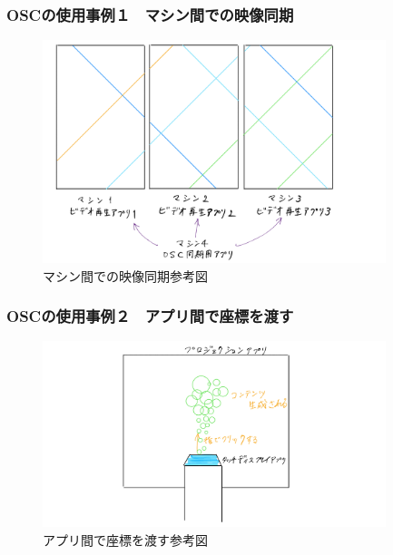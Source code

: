 \documentclass[10pt, dvipdfmx]{beamer}
\begin{document}
        \begin{frame}
            \frametitle{OSCの使用事例１　マシン間での映像同期}
                \begin{figure}[htb]
                    \includegraphics[width=100mm]{images/osc-1.png}
                    \caption{マシン間での映像同期参考図}
                    \label{fig:osc-1}
                \end{figure}
        \end{frame}

        \begin{frame}
            \frametitle{OSCの使用事例２　アプリ間で座標を渡す}
                \begin{figure}[htb]
                    \includegraphics[width=100mm]{images/osc-2.png}
                    \caption{アプリ間で座標を渡す参考図}
                    \label{fig:osc-2}
                \end{figure}
        \end{frame}
\end{document}
